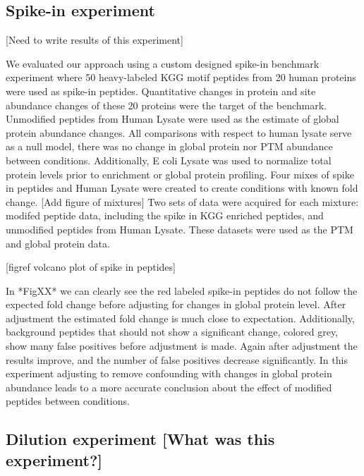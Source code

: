 \documentclass[mcp]{article}
\numberwithin{figure}{section} %
\numberwithin{table}{section}
\def\todo#1{{\color{red}[#1]}}
\begin{document}
\subsection*{Spike-in experiment}
\todo{Need to write results of this experiment}

We evaluated our approach using a custom designed spike-in benchmark experiment where 50 heavy-labeled KGG motif peptides from 20 human proteins were used as spike-in peptides. Quantitative changes in protein and site abundance changes of these 20 proteins were the target of the benchmark. Unmodified peptides from Human Lysate were used as the estimate of global protein abundance changes. All comparisons with respect to human lysate serve as a null model, there was no change in global protein nor PTM abundance between conditions. Additionally, E coli Lysate was used to normalize total protein levels prior to enrichment or global protein profiling. Four mixes of spike in peptides and Human Lysate were created to create conditions with known fold change. \todo{Add figure of mixtures} Two sets of data were acquired for each mixture: modifed peptide data, including the spike in KGG enriched peptides, and unmodified peptides from Human Lysate. These datasets were used as the PTM and global protein data.

\todo{figref volcano plot of spike in peptides}

In *FigXX* we can clearly see the red labeled spike-in peptides do not follow the expected fold change before adjusting for changes in global protein level. After adjustment the estimated fold change is much close to expectation. Additionally, background peptides that should not show a significant change, colored grey, show many false positives before adjustment is made. Again after adjustment the results improve, and the number of false positives decrease significantly. In this experiment adjusting to remove confounding with changes in global protein abundance leads to a more accurate conclusion about the effect of modified peptides between conditions.

\subsection*{Dilution experiment [What was this experiment?]}
\end{document}
